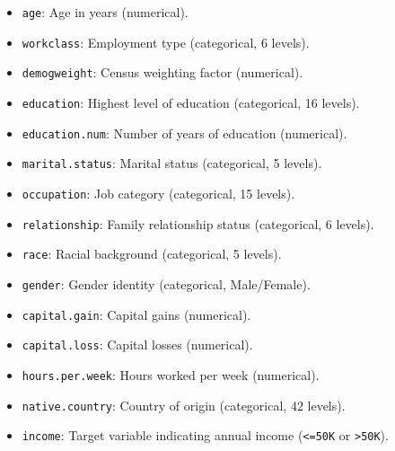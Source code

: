 \documentclass[
]{book}
\newcommand{\passthrough}[1]{#1}
\providecommand{\tightlist}{%
  \setlength{\itemsep}{0pt}\setlength{\parskip}{0pt}}
\theoremstyle{definition}
\theoremstyle{definition}
\theoremstyle{definition}
\theoremstyle{definition}
\theoremstyle{remark}
\begin{document}
\begin{itemize}
\tightlist
\item
  \passthrough{\lstinline!age!}: Age in years (numerical).\\
\item
  \passthrough{\lstinline!workclass!}: Employment type (categorical, 6 levels).\\
\item
  \passthrough{\lstinline!demogweight!}: Census weighting factor (numerical).\\
\item
  \passthrough{\lstinline!education!}: Highest level of education (categorical, 16 levels).\\
\item
  \passthrough{\lstinline!education.num!}: Number of years of education (numerical).\\
\item
  \passthrough{\lstinline!marital.status!}: Marital status (categorical, 5 levels).\\
\item
  \passthrough{\lstinline!occupation!}: Job category (categorical, 15 levels).\\
\item
  \passthrough{\lstinline!relationship!}: Family relationship status (categorical, 6 levels).\\
\item
  \passthrough{\lstinline!race!}: Racial background (categorical, 5 levels).\\
\item
  \passthrough{\lstinline!gender!}: Gender identity (categorical, Male/Female).\\
\item
  \passthrough{\lstinline!capital.gain!}: Capital gains (numerical).\\
\item
  \passthrough{\lstinline!capital.loss!}: Capital losses (numerical).\\
\item
  \passthrough{\lstinline!hours.per.week!}: Hours worked per week (numerical).\\
\item
  \passthrough{\lstinline!native.country!}: Country of origin (categorical, 42 levels).\\
\item
  \passthrough{\lstinline!income!}: Target variable indicating annual income (\passthrough{\lstinline!<=50K!} or \passthrough{\lstinline!>50K!}).
\end{itemize}
\end{document}
